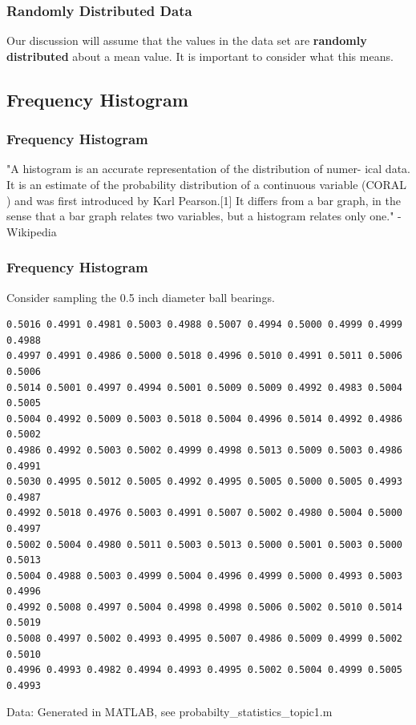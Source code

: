 \documentclass[fleqn]{beamer} %
\newcommand{\sectionIsubsectionIItitle}{Randomly Distributed Data}
\newcommand{\sectionIsubsectionIIItitle}{Frequency Histogram}
\begin{document}
			\begin{frame}
				\frametitle{\sectionIsubsectionIItitle}

				Our discussion will assume that the values in the data set are {\bf \PN randomly distributed } about a mean value. It is important to consider what this means.
				
			\end{frame}

		\subsection{\sectionIsubsectionIIItitle}\label{sectionIsubsectionIII}
			\begin{frame} 
				\frametitle{\sectionIsubsectionIIItitle}
				\bigskip

					"A {\GR histogram} is an accurate representation of the distribution of numer-
					ical data. It is an estimate of the probability distribution of a continuous
					variable (CORAL ) and was first introduced by Karl Pearson.[1] It differs
					from a bar graph, in the sense that a bar graph relates two variables, but a
					histogram relates only one." - Wikipedia

			\end{frame}	

			\begin{frame}[containsverbatim] 
				\frametitle{\sectionIsubsectionIIItitle}

				Consider sampling the 0.5 inch diameter ball bearings.

				\lstset{basicstyle=\scriptsize}

				\begin{lstlisting}
0.5016 0.4991 0.4981 0.5003 0.4988 0.5007 0.4994 0.5000 0.4999 0.4999 0.4988  
0.4997 0.4991 0.4986 0.5000 0.5018 0.4996 0.5010 0.4991 0.5011 0.5006 0.5006  
0.5014 0.5001 0.4997 0.4994 0.5001 0.5009 0.5009 0.4992 0.4983 0.5004 0.5005 
0.5004 0.4992 0.5009 0.5003 0.5018 0.5004 0.4996 0.5014 0.4992 0.4986 0.5002 
0.4986 0.4992 0.5003 0.5002 0.4999 0.4998 0.5013 0.5009 0.5003 0.4986 0.4991
0.5030 0.4995 0.5012 0.5005 0.4992 0.4995 0.5005 0.5000 0.5005 0.4993 0.4987 
0.4992 0.5018 0.4976 0.5003 0.4991 0.5007 0.5002 0.4980 0.5004 0.5000 0.4997 
0.5002 0.5004 0.4980 0.5011 0.5003 0.5013 0.5000 0.5001 0.5003 0.5000 0.5013  
0.5004 0.4988 0.5003 0.4999 0.5004 0.4996 0.4999 0.5000 0.4993 0.5003 0.4996  
0.4992 0.5008 0.4997 0.5004 0.4998 0.4998 0.5006 0.5002 0.5010 0.5014 0.5019
0.5008 0.4997 0.5002 0.4993 0.4995 0.5007 0.4986 0.5009 0.4999 0.5002 0.5010  
0.4996 0.4993 0.4982 0.4994 0.4993 0.4995 0.5002 0.5004 0.4999 0.5005 0.4993 
				\end{lstlisting}

				{\tiny Data: Generated in MATLAB, see probabilty\_statistics\_topic1.m }
				
			\end{frame}	
\end{document}
